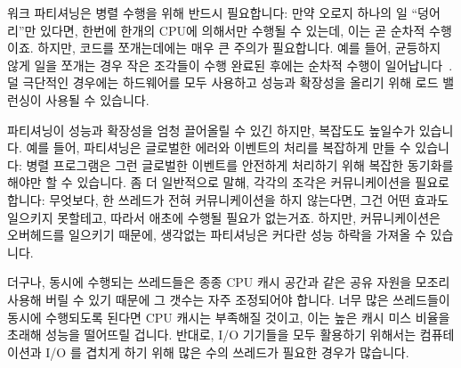 워크 파티셔닝은 병렬 수행을 위해 반드시 필요합니다:
만약 오로지 하나의 일 ``덩어리''만 있다면, 한번에 한개의 CPU에 의해서만 수행될
수 있는데, 이는 곧 순차적 수행이죠.
하지만, 코드를 쪼개는데에는 매우 큰 주의가 필요합니다.
예를 들어, 균등하지 않게 일을 쪼개는 경우 작은 조각들이 수행 완료된 후에는
순차적 수행이 일어납니다~\cite{GeneAmdahl1967AmdahlsLaw}.
덜 극단적인 경우에는 하드웨어를 모두 사용하고 성능과 확장성을 올리기 위해 로드
밸런싱이 사용될 수 있습니다.

파티셔닝이 성능과 확장성을 엄청 끌어올릴 수 있긴 하지만, 복잡도도 높일수가
있습니다.
예를 들어, 파티셔닝은 글로벌한 에러와 이벤트의 처리를 복잡하게 만들 수
있습니다:
병렬 프로그램은 그런 글로벌한 이벤트를 안전하게 처리하기 위해 복잡한 동기화를
해야만 할 수 있습니다.
좀 더 일반적으로 말해, 각각의 조각은 커뮤니케이션을 필요로 합니다:
무엇보다, 한 쓰레드가 전혀 커뮤니케이션을 하지 않는다면, 그건 어떤 효과도
일으키지 못할테고, 따라서 애초에 수행될 필요가 없는거죠.
하지만, 커뮤니케이션은 오버헤드를 일으키기 때문에, 생각없는 파티셔닝은 커다란
성능 하락을 가져올 수 있습니다.

더구나, 동시에 수행되는 쓰레드들은 종종 CPU 캐시 공간과 같은 공유 자원을 모조리
사용해 버릴 수 있기 때문에 그 갯수는 자주 조정되어야 합니다.
너무 많은 쓰레드들이 동시에 수행되도록 된다면 CPU 캐시는 부족해질 것이고, 이는
높은 캐시 미스 비율을 초래해 성능을 떨어뜨릴 겁니다.
반대로, I/O 기기들을 모두 활용하기 위해서는 컴퓨테이션과 I/O 를 겹치게 하기
위해 많은 수의 쓰레드가 필요한 경우가 많습니다.
\iffalse

